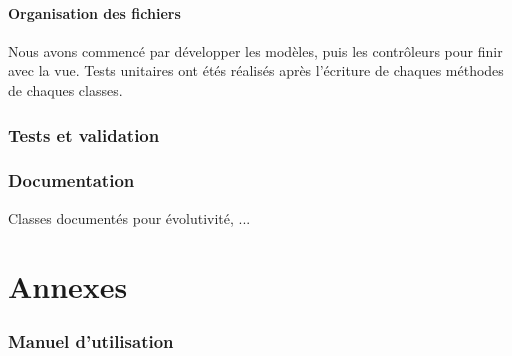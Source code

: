 \documentclass{polytech/polytech}
\begin{document}
	\subsection{Organisation des fichiers}

	Nous avons commencé par développer les modèles, puis les contrôleurs pour finir avec la vue.
	Tests unitaires ont étés réalisés après l'écriture de chaques méthodes de chaques classes.

	\section{Tests et validation}

	\section{Documentation}

	Classes documentés pour évolutivité, ...

	\part{Annexes}

	\section{Manuel d'utilisation}
	
\end{document}
